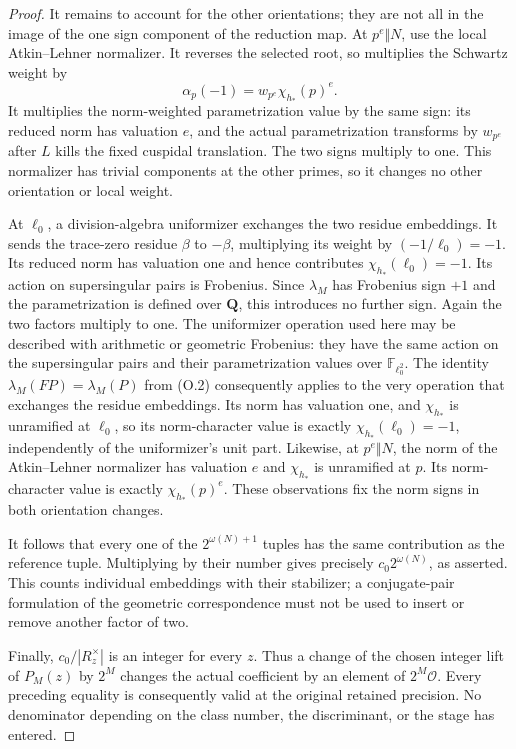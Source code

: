 \documentclass[11pt]{article}
\theoremstyle{definition}
\theoremstyle{remark}
\begin{document}
\begin{proof}
It remains to account for the other orientations; they are not
all in the image of the one sign component of the reduction map.
At $p^e\Vert N$, use the local Atkin--Lehner normalizer. It
reverses the selected root, so multiplies the Schwartz weight by
\[
              \alpha_p(-1)=w_{p^e}\chi_{h_*}(p)^e.
\]
It multiplies the norm-weighted parametrization value by the same
sign: its reduced norm has valuation $e$, and the actual
parametrization transforms by $w_{p^e}$ after $L$ kills the fixed
cuspidal translation. The two signs multiply to one. This
normalizer has trivial components at the other primes, so it
changes no other orientation or local weight.

At $\ell_0$, a division-algebra uniformizer exchanges the two
residue embeddings. It sends the trace-zero residue $\beta$ to
$-\beta$, multiplying its weight by $(-1/\ell_0)=-1$. Its
reduced norm has valuation one and hence contributes
$\chi_{h_*}(\ell_0)=-1$. Its action on supersingular pairs is
Frobenius. Since $\lambda_M$ has Frobenius sign $+1$ and the
parametrization is defined over $\mathbf Q$, this introduces no
further sign. Again the two factors multiply to one.
The uniformizer operation used here may be described with arithmetic
or geometric Frobenius: they have the same action on the supersingular
pairs and their parametrization values over $\mathbb F_{\ell_0^2}$.
The identity $\lambda_M(FP)=\lambda_M(P)$ from (O.2) consequently
applies to the very operation that exchanges the residue embeddings.
Its norm has valuation one, and $\chi_{h_*}$ is unramified at
$\ell_0$, so its norm-character value is exactly
$\chi_{h_*}(\ell_0)=-1$, independently of the uniformizer's unit part.
Likewise, at $p^e\Vert N$, the norm of the Atkin--Lehner normalizer
has valuation $e$ and $\chi_{h_*}$ is unramified at $p$. Its
norm-character value is exactly $\chi_{h_*}(p)^e$. These observations
fix the norm signs in both orientation changes.


It follows that every one of the $2^{\omega(N)+1}$ tuples has
the same contribution as the reference tuple. Multiplying by
their number gives precisely $c_0 2^{\omega(N)}$, as asserted.
This counts individual embeddings with their stabilizer; a
conjugate-pair formulation of the geometric correspondence must
not be used to insert or remove another factor of two.

Finally, $c_0/|R_z^\times|$ is an integer for every $z$. Thus a
change of the chosen integer lift of $P_M(z)$ by $2^M$ changes
the actual coefficient by an element of $2^M\mathcal O$.
Every preceding equality is consequently valid at the original
retained precision. No denominator depending on the class number,
the discriminant, or the stage has entered.

\end{proof}
\end{document}
